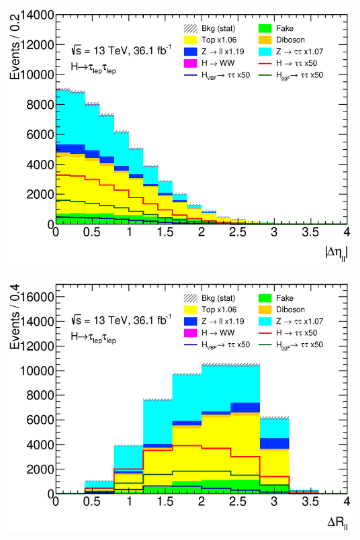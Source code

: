 \begin{figure}[htb]
\begin{subfigure}[t]{0.45\textwidth}
        \caption{}\label{fig:event_selection:cutflow:x2}
    \end{subfigure}
    \begin{subfigure}[t]{0.45\textwidth}
        \includegraphics[width=\textwidth]{./plots/event_selection/presel/ll-CutX-DeltaEtaLL-lin.eps}
        \caption{}\label{fig:event_selection:cutflow:detall}
    \end{subfigure}
    \begin{subfigure}[t]{0.45\textwidth}
        \includegraphics[width=\textwidth]{./plots/event_selection/presel/ll-CutDEtaLL-DeltaRLL-lin.eps}
        \caption{}\label{fig:event_selection:cutflow:drll}
    \end{subfigure}
    \begin{subfigure}[t]{0.45\textwidth}

\end{subfigure}
\end{figure}
